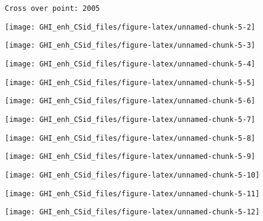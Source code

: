 \documentclass[
  10pt,
  a4paper,oneside]{article}
\begin{document}
\begin{verbatim}
Cross over point: 2005 
\end{verbatim}

\begin{center}\texttt{[image: GHI\_enh\_CSid\_files/figure-latex/unnamed-chunk-5-2]} \end{center}

\begin{center}\texttt{[image: GHI\_enh\_CSid\_files/figure-latex/unnamed-chunk-5-3]} \end{center}

\begin{center}\texttt{[image: GHI\_enh\_CSid\_files/figure-latex/unnamed-chunk-5-4]} \end{center}

\begin{center}\texttt{[image: GHI\_enh\_CSid\_files/figure-latex/unnamed-chunk-5-5]} \end{center}

\begin{center}\texttt{[image: GHI\_enh\_CSid\_files/figure-latex/unnamed-chunk-5-6]} \end{center}

\begin{center}\texttt{[image: GHI\_enh\_CSid\_files/figure-latex/unnamed-chunk-5-7]} \end{center}

\begin{center}\texttt{[image: GHI\_enh\_CSid\_files/figure-latex/unnamed-chunk-5-8]} \end{center}

\begin{center}\texttt{[image: GHI\_enh\_CSid\_files/figure-latex/unnamed-chunk-5-9]} \end{center}

\begin{center}\texttt{[image: GHI\_enh\_CSid\_files/figure-latex/unnamed-chunk-5-10]} \end{center}

\begin{center}\texttt{[image: GHI\_enh\_CSid\_files/figure-latex/unnamed-chunk-5-11]} \end{center}

\begin{center}\texttt{[image: GHI\_enh\_CSid\_files/figure-latex/unnamed-chunk-5-12]} \end{center}
\end{document}
